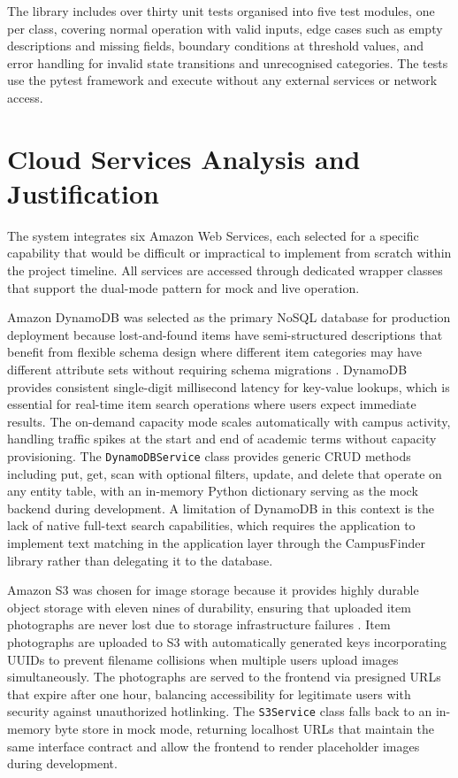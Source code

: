 \documentclass[conference]{IEEEtran}
\begin{document}
The library includes over thirty unit tests organised into five test modules, one per class, covering normal operation with valid inputs, edge cases such as empty descriptions and missing fields, boundary conditions at threshold values, and error handling for invalid state transitions and unrecognised categories. The tests use the pytest framework and execute without any external services or network access.

\section{Cloud Services Analysis and Justification}

The system integrates six Amazon Web Services, each selected for a specific capability that would be difficult or impractical to implement from scratch within the project timeline. All services are accessed through dedicated wrapper classes that support the dual-mode pattern for mock and live operation.

Amazon DynamoDB was selected as the primary NoSQL database for production deployment because lost-and-found items have semi-structured descriptions that benefit from flexible schema design where different item categories may have different attribute sets without requiring schema migrations \cite{dynamodb}. DynamoDB provides consistent single-digit millisecond latency for key-value lookups, which is essential for real-time item search operations where users expect immediate results. The on-demand capacity mode scales automatically with campus activity, handling traffic spikes at the start and end of academic terms without capacity provisioning. The \texttt{DynamoDBService} class provides generic CRUD methods including put, get, scan with optional filters, update, and delete that operate on any entity table, with an in-memory Python dictionary serving as the mock backend during development. A limitation of DynamoDB in this context is the lack of native full-text search capabilities, which requires the application to implement text matching in the application layer through the CampusFinder library rather than delegating it to the database.

Amazon S3 was chosen for image storage because it provides highly durable object storage with eleven nines of durability, ensuring that uploaded item photographs are never lost due to storage infrastructure failures \cite{s3guide}. Item photographs are uploaded to S3 with automatically generated keys incorporating UUIDs to prevent filename collisions when multiple users upload images simultaneously. The photographs are served to the frontend via presigned URLs that expire after one hour, balancing accessibility for legitimate users with security against unauthorized hotlinking. The \texttt{S3Service} class falls back to an in-memory byte store in mock mode, returning localhost URLs that maintain the same interface contract and allow the frontend to render placeholder images during development.
\end{document}
